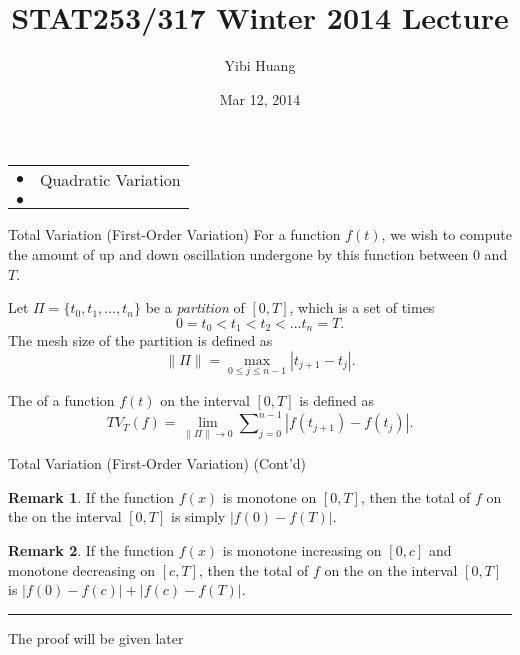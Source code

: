 \documentclass[letterpaper,handout]{beamer}
\title{STAT253/317 Winter 2014 Lecture \chapnum} \date{Mar 12, 2014} \author{Yibi Huang}
\def\Sum{\sum\nolimits}
\begin{document}
\begin{frame}\maketitle
\bigskip
\begin{center}\large
\begin{tabular}{ll}
$\bullet$ & Quadratic Variation\\
$\bullet$ &
\end{tabular}
\end{center}
\end{frame}
\begin{frame}{Total Variation (First-Order Variation)}
For a function $f(t)$, we wish to compute the amount of up and down oscillation undergone by this function between 0 and $T$.

Let $\Pi =\{t_0,t_1,\ldots,t_n\}$ be a {\em partition} of $[0,T]$, which is a set of times
$$0= t_0 <t_1< t_2<\ldots t_n =T.$$
The mesh size of the partition is defined as $$\|\Pi\|=\max_{0\le j\le n-1}|t_{j+1}-t_j|.$$

The  of a function $f(t)$ on the interval $[0,T]$ is defined as
$$TV_T(f)=\lim_{\|\Pi\|\to 0}\Sum_{j=0}^{n-1}|f(t_{j+1})-f(t_j)|.$$
\end{frame}
\begin{frame}{Total Variation (First-Order Variation) (Cont'd)}\,\par

{\bf Remark 1}. If the function $f(x)$ is monotone on $[0,T]$, then the total of $f$ on the on the interval $[0,T]$
is simply $|f(0)-f(T)|.$\vspace{0.75in}



{\bf Remark 2}. If the function $f(x)$ is monotone increasing on $[0,c]$ and monotone decreasing on $[c,T]$, then the total of $f$ on the on the interval $[0,T]$ is $|f(0)-f(c)|+|f(c)-f(T)|.$\vspace{.75in}


\medskip\hrule\medskip
{}\smallskip

The proof will be given later
\end{frame}
\end{document}
